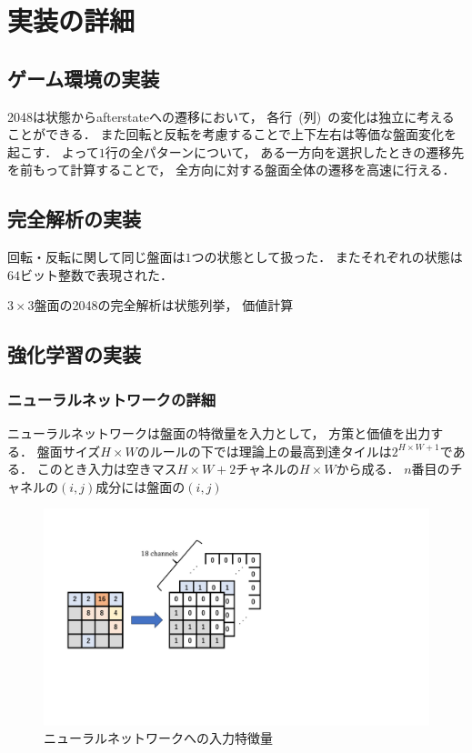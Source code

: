 \chapter{実装の詳細}

\section{ゲーム環境の実装}
2048は状態からafterstateへの遷移において， 各行~(列)~の変化は独立に考えることができる．
また回転と反転を考慮することで上下左右は等価な盤面変化を起こす．
よって$1$行の全パターンについて， ある一方向を選択したときの遷移先を前もって計算することで， 全方向に対する盤面全体の遷移を高速に行える．

\section{完全解析の実装}
回転・反転に関して同じ盤面は$1$つの状態として扱った．
またそれぞれの状態は$64$ビット整数で表現された．

$3\times3$盤面の2048の完全解析は状態列挙， 価値計算

\section{強化学習の実装}
\subsection{ニューラルネットワークの詳細}
ニューラルネットワークは盤面の特徴量を入力として， 方策と価値を出力する．
盤面サイズ$H \times W$のルールの下では理論上の最高到達タイルは$2^{H \times W + 1}$である．
このとき入力は空きマス$H \times W + 2$チャネルの$H \times W$から成る．
$n$番目のチャネルの$(i,j)$成分には盤面の$(i,j)$
\begin{figure}[t]
    \centering
    \includegraphics[width=0.6\linewidth{}]{figures/encoding.pdf}
    \caption{ニューラルネットワークへの入力特徴量}
    \label{fig:input_encoding}
\end{figure}

